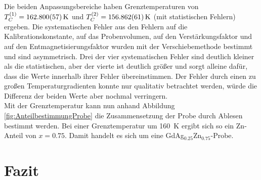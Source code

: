 \documentclass[12pt,a4paper]{article}
\begin{document}
Die beiden Anpassungsbereiche haben Grenztemperaturen von $T_C^{(1)} = \SI{162,800 \pm 0,057}{K}$ und $T_C^{(2)} = \SI{156,862 \pm 0,061}{K}$ (mit statistischen Fehlern) ergeben. Die systematischen Fehler aus den Fehlern auf die Kalibrationskonstante, auf das Probenvolumen, auf den Verstärkungsfaktor und auf den Entmagnetisierungsfaktor wurden mit der Verschiebemethode bestimmt und sind asymmetrisch. Drei der vier systematischen Fehler sind deutlich kleiner als die statistischen, aber der vierte ist deutlich größer und sorgt alleine dafür, dass die Werte innerhalb ihrer Fehler übereinstimmen. Der Fehler durch einen zu großen Temperaturgradienten konnte nur qualitativ betrachtet werden, würde die Differenz der beiden Werte aber nochmal verringern. \\
Mit der Grenztemperatur kann nun anhand Abbildung \ref{fig:AnteilbestimmungProbe} die Zusammensetzung der Probe durch Ablesen bestimmt werden. Bei einer Grenztemperatur um \SI{160}{K} ergibt sich so ein Zn-Anteil von $x = 0.75$. Damit handelt es sich um eine GdAg$_{0.25}$Zn$_{0.75}$-Probe.


\section{Fazit}
\end{document}
